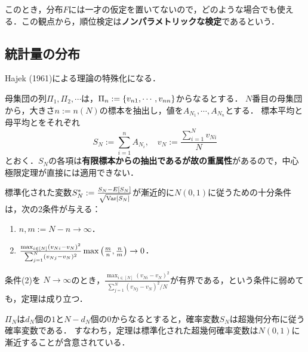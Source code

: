 \documentclass[uplatex,dvipdfmx]{jsreport}
\begin{document}
\begin{remark}
    このとき，分布$F$には一才の仮定を置いてないので，どのような場合でも使える．この観点から，順位検定は\textbf{ノンパラメトリックな検定}であるという．
\end{remark}

\subsection{統計量の分布}

\begin{tcolorbox}[colframe=ForestGreen, colback=ForestGreen!10!white,breakable,colbacktitle=ForestGreen!40!white,coltitle=black,fonttitle=\bfseries\sffamily,
title=]
    Hajek (1961)による理論の特殊化になる．
\end{tcolorbox}

\begin{notation}
    母集団の列$\Pi_1,\Pi_2,\cdots$は，$\Pi_n:=\left\{v_{n1},\cdots,v_{nn}\right\}$からなるとする．
    $N$番目の母集団から，大きさ$n:=n(N)$の標本を抽出し，値を$A_{N_1},\cdots,A_{N_n}$とする．
    標本平均と母平均とをそれぞれ
    \[S_N:=\sum_{i=1}^nA_{N_i},\quad v_N:=\frac{\sum_{i=1}^Nv_{Ni}}{N}\]
    とおく．$S_N$の各項は\textbf{有限標本からの抽出であるが故の重属性}があるので，中心極限定理が直接には適用できない．
\end{notation}

\begin{theorem}
    標準化された変数$S^*_N:=\frac{S_N-E[S_N]}{\sqrt{\mathrm{Var}[S_N]}}$が漸近的に$N(0,1)$に従うための十分条件は，次の2条件が与える：
    \begin{enumerate}
        \item $n,m:=N-n\to\infty$．
        \item $\frac{\max_{i\in[N]}(v_{Ni}-v_{N})^2}{\sum_{j=1}^N(v_{Nj}-v_N)^2}\max\left(\frac{m}{n},\frac{n}{m}\right)\to0$．
    \end{enumerate}
\end{theorem}

\begin{corollary}
    条件(2)を
    $N\to\infty$のとき，$\frac{\max_{i\in[N]}(v_{Ni}-v_{N})^2}{\sum_{j=1}^N(v_{Nj}-v_N)^2/N}$が有界である，という条件に弱めても，定理は成り立つ．
\end{corollary}

\begin{example}
    $\Pi_N$は$d_N$個の$1$と$N-d_N$個の$0$からなるとすると，確率変数$S_N$は超幾何分布に従う確率変数である．
    すなわち，定理は標準化された超幾何確率変数は$N(0,1)$に漸近することが含意されている．
\end{example}
\end{document}
